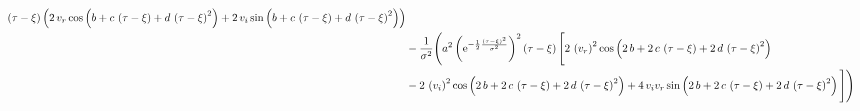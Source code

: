 \begin{align}
 \left( \tau-\xi \right)  \left( 2\,v_r \cos \left( b+c\, \left( \tau-\xi \right) +d\, \left( \tau-{
 \xi} \right) ^{2} \right) +2\,v_i 
\sin \left( b+c\, \left( \tau-\xi \right) +d\, \left( \tau-\xi
 \right) ^{2} \right)  \right)\nonumber \\
&- \frac{1}{ {
\sigma}^{2}} \Bigg( {a}^{2} \left( {{\rm e}^{
-\frac{1}{2}{\frac { \left( \tau-\xi \right) ^{2}}{{\sigma}^{2}}}}}
 \right) ^{2} \left( \tau-\xi \right)  \Bigg[ 2\, \left( v_r \right) ^{2}\cos \left( 2\,b+2\,c\, \left( \tau
-{ \xi} \right) +2\,d\, \left( \tau-\xi \right) ^{2} \right) \nonumber \\
& -2\,
 \left( v_i  \right) ^{2}\cos \left( 2
\,b+2\,c\, \left( \tau-\xi \right) +2\,d\, \left( \tau-\xi
 \right) ^{2} \right) +4\,v_i v_r \sin \left( 2\,b+2\,c\, \left( \tau-\xi
 \right) +2\,d\, \left( \tau-\xi \right) ^{2} \right)  \Bigg] \Bigg)
\end{align}


